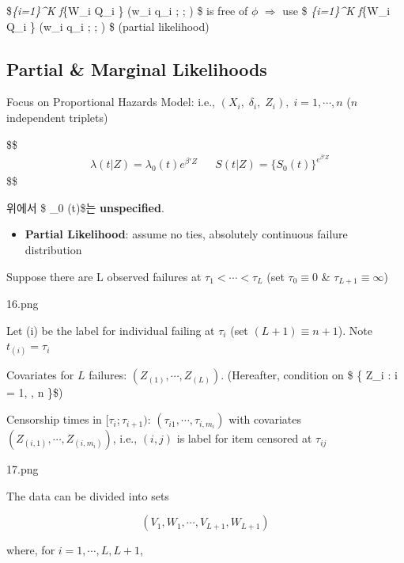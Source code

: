 \documentclass[
]{book}
\providecommand{\tightlist}{%
  \setlength{\itemsep}{0pt}\setlength{\parskip}{0pt}}
\theoremstyle{definition}
\theoremstyle{definition}
\theoremstyle{definition}
\theoremstyle{definition}
\theoremstyle{remark}
\begin{document}
\$\prod\emph{\{i=1\}\^{}K f}\{W\_i \textbar{} Q\_i \} (w\_i \Big \textbar{} q\_i ; ; \theta) \$ is free of \(\phi\) \(\Rightarrow\) use \$ \prod\emph{\{i=1\}\^{}K f}\{W\_i \textbar{} Q\_i \} (w\_i \Big \textbar{} q\_i ; ; \beta) \$ (partial likelihood)

\hypertarget{partial-marginal-likelihoods}{%
\subsection{Partial \& Marginal Likelihoods}\label{partial-marginal-likelihoods}}

Focus on Proportional Hazards Model: i.e., \((X_i, \; \delta_i, \; Z_i), \; i = 1, \cdots, n\) (\(n\) independent triplets)

\$\$
\begin{align}

&\lambda(t \Big | Z ) = \lambda_0 (t) e^{\beta ' Z} &&S(t \Big | Z) = \Big \{ S_0(t) \Big \}^{e^{\beta ' Z}} \tag{1}

\end{align}
\$\$

위에서 \$ \lambda\_0 (t)\$는 \textbf{unspecified}.

\begin{itemize}
\tightlist
\item
  \textbf{Partial Likelihood}: assume no ties, absolutely continuous failure distribution
\end{itemize}

Suppose there are L observed failures at \(\tau_1 < \cdots < \tau_L\) (set \(\tau_0 \equiv 0\) \& \(\tau_{L+1} \equiv \infty\))

16.png

Let (i) be the label for individual failing at \(\tau_i\) (set \((L + 1) \equiv n + 1\)). Note \(t_{(i)} = \tau_i\)

Covariates for \(L\) failures: \((Z_{(1)}, \cdots, Z_{(L)})\). (Hereafter, condition on \$ \Big \{ Z\_i : i = 1, \cdots, n \Big \}\$)

Censorship times in \([\tau_i; \tau_{i+1})\): \((\tau_{i1}, \cdots, \tau_{i, m_i})\) with covariates \((Z_{(i,1)}, \cdots, Z_{(i,m_i)})\), i.e., \((i, j)\) is label for item censored at \(\tau_{ij}\)

17.png

The data can be divided into sets

\[
(V_1 , W_1, \cdots, V_{L+1} ,  W_{L+1})
\]

where, for \(i = 1, \cdots, L, L+1\),
\end{document}
